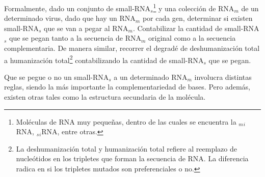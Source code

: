 \documentclass[12pt,a4paper]{article}
\begin{document}
\par Formalmente, dado un conjunto de small-RNA$_s$\footnote{Moléculas de RNA muy pequeñas, dentro de las cuales se encuentra la $_m$$_i$RNA, $_s$$_i$RNA, entre otras.} y una colección de RNA$_m$ de un determinado virus, dado que hay un RNA$_m$ por cada gen, determinar si existen small-RNA$_s$ que se van a pegar al RNA$_m$. Contabilizar la cantidad de small-RNA$_s$ que se pegan tanto a la secuencia de RNA$_m$ original como a la secuencia complementaria. De manera similar, recorrer el degradé de deshumanización total a humanización total\footnote{La deshumanización total y humanización total refiere al reemplazo de nucleótidos en los tripletes que forman la secuencia de RNA. La diferencia radica en si los tripletes mutados son preferenciales o no.} contabilizando la cantidad de small-RNA$_s$ que se pegan. 
\par Que se pegue o no un small-RNA$_s$ a un determinado RNA$_m$ involucra distintas reglas, siendo la más importante la complementariedad de bases. Pero además, existen otras tales como la estructura secundaria de la molécula.



\end{document}
